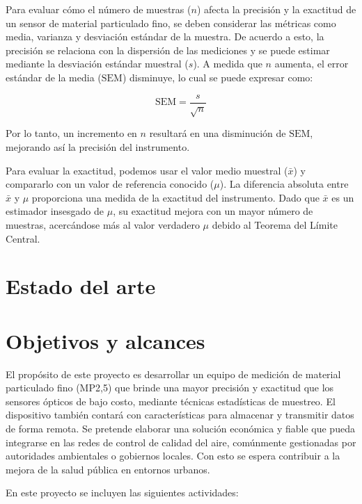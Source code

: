 Para evaluar cómo el número de muestras (\( n \)) afecta la precisión y la exactitud de un sensor de material particulado fino, se deben considerar las métricas como media, varianza y desviación estándar de la muestra. De acuerdo a esto, la precisión se relaciona con la dispersión de las mediciones y se puede estimar mediante la desviación estándar muestral ($s$). A medida que \( n \) aumenta, el error estándar de la media (\( \text{SEM} \)) disminuye, lo cual se puede expresar como:

\[
\text{SEM} = \frac{s}{\sqrt{n}}
\]

Por lo tanto, un incremento en \( n \) resultará en una disminución de \( \text{SEM} \), mejorando así la precisión del instrumento.

Para evaluar la exactitud, podemos usar el valor medio muestral (\( \bar{x} \)) y compararlo con un valor de referencia conocido (\( \mu \)). La diferencia absoluta entre \( \bar{x} \) y \( \mu \) proporciona una medida de la exactitud del instrumento. Dado que \( \bar{x} \) es un estimador insesgado de \( \mu \), su exactitud mejora con un mayor número de muestras, acercándose más al valor verdadero \( \mu \) debido al Teorema del Límite Central.

\section{Estado del arte}

\section{Objetivos y alcances}

El propósito de este proyecto es desarrollar un equipo de medición de material particulado fino (MP2,5) que brinde una mayor precisión y exactitud que los sensores ópticos de bajo costo, mediante técnicas estadísticas de muestreo. El dispositivo también contará con características para almacenar y transmitir datos de forma remota. Se pretende elaborar una solución económica y fiable que pueda integrarse en las redes de control de calidad del aire, comúnmente gestionadas por autoridades ambientales o gobiernos locales. Con esto se espera contribuir a la mejora de la salud pública en entornos urbanos.

En este proyecto se incluyen las siguientes actividades:

